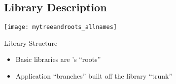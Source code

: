 \subsection*{Library Description}
\begin{frame}[t]


    \begin{minipage}[h]{.6\textwidth}
    \begin{center}
      \texttt{[image: mytreeandroots\_allnames]}
    \end{center}
  \end{minipage}
  \begin{minipage}[h]{.35\textwidth}
    \begin{block}{Library Structure}
      \begin{itemize}
    \item Basic libraries are \libMesh{}'s ``roots''
    \item Application ``branches'' built off the library ``trunk''
      \end{itemize}
    \end{block}
  \end{minipage}



\end{frame}
